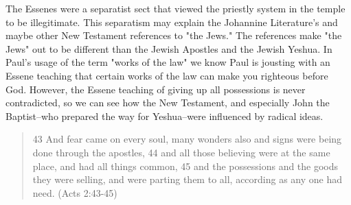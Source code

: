 \documentclass[11pt]{article}
\begin{document}
The Essenes were a separatist sect that viewed the priestly system in the temple to be illegitimate. This separatism may explain the Johannine Literature's and maybe other New Testament references to "the Jews." The references make "the Jews" out to be different than the Jewish Apostles and the Jewish Yeshua.
In Paul's usage of the term "works of the law" we know Paul is jousting with an Essene teaching that certain works of the law can make you righteous before God.\cite{Paul MMT} However, the Essene teaching of giving up all possessions is never contradicted, so we can see how the New Testament, and especially John the Baptist--who prepared the way for Yeshua--were influenced by radical ideas. 
\begin{quote}
43 And fear came on every soul, many wonders also and signs were being done through the apostles, 44 and all those believing were at the same place, and had all things common,
45 and the possessions and the goods they were selling, and were parting them to all, according as any one had need. (Acts 2:43-45)
\end{quote}
\end{document}
